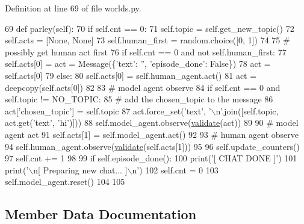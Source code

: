 Definition at line 69 of file worlds.\+py.


\begin{DoxyCode}
69     \textcolor{keyword}{def }parley(self):
70         \textcolor{keywordflow}{if} self.cnt == 0:
71             self.topic = self.get\_new\_topic()
72             self.acts = [\textcolor{keywordtype}{None}, \textcolor{keywordtype}{None}]
73             self.human\_first = random.choice([0, 1])
74 
75         \textcolor{comment}{# possibly get human act first}
76         \textcolor{keywordflow}{if} self.cnt == 0 \textcolor{keywordflow}{and} \textcolor{keywordflow}{not} self.human\_first:
77             self.acts[0] = act = Message(\{\textcolor{stringliteral}{'text'}: \textcolor{stringliteral}{''}, \textcolor{stringliteral}{'episode\_done'}: \textcolor{keyword}{False}\})
78             act = self.acts[0]
79         \textcolor{keywordflow}{else}:
80             self.acts[0] = self.human\_agent.act()
81             act = deepcopy(self.acts[0])
82 
83         \textcolor{comment}{# model agent observe}
84         \textcolor{keywordflow}{if} self.cnt == 0 \textcolor{keywordflow}{and} self.topic != NO\_TOPIC:
85             \textcolor{comment}{# add the chosen\_topic to the message}
86             act[\textcolor{stringliteral}{'chosen\_topic'}] = self.topic
87             act.force\_set(\textcolor{stringliteral}{'text'}, \textcolor{stringliteral}{'\(\backslash\)n'}.join([self.topic, act.get(\textcolor{stringliteral}{'text'}, \textcolor{stringliteral}{'hi'})]))
88         self.model\_agent.observe(\hyperlink{namespaceparlai_1_1core_1_1worlds_afc3fad603b7bce41dbdc9cdc04a9c794}{validate}(act))
89 
90         \textcolor{comment}{# model agent act}
91         self.acts[1] = self.model\_agent.act()
92 
93         \textcolor{comment}{# human agent observe}
94         self.human\_agent.observe(\hyperlink{namespaceparlai_1_1core_1_1worlds_afc3fad603b7bce41dbdc9cdc04a9c794}{validate}(self.acts[1]))
95 
96         self.update\_counters()
97         self.cnt += 1
98 
99         \textcolor{keywordflow}{if} self.episode\_done():
100             print(\textcolor{stringliteral}{'[ CHAT DONE ]'})
101             print(\textcolor{stringliteral}{'\(\backslash\)n[ Preparing new chat... ]\(\backslash\)n'})
102             self.cnt = 0
103             self.model\_agent.reset()
104 
105 
\end{DoxyCode}


\subsection{Member Data Documentation}
\mbox{\label{classparlai_1_1tasks_1_1wizard__of__wikipedia_1_1worlds_1_1InteractiveWorld_af926c611144cdc54b7f1c631286b388b}} 
